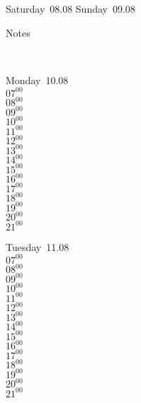 \documentclass[11pt,a4paper]{book}\usepackage[]{graphicx}\usepackage[]{color}
\begin{document}
{{{{{{\begin{tcolorbox}
\end{tcolorbox} 
\begin{tcolorbox}[height=(\textheight-10mm)/6]
Saturday~08.08
\tcblower
Sunday~09.08
\end{tcolorbox} %
\begin{tcolorbox}[height=(\textheight-10mm)/6,sidebyside=false]
Notes
\end{tcolorbox}
\clearpage
\vspace{2 mm}\\
\begin{tcolorbox}
Monday~10.08\\
{ 
  $07^{00}$\\
$08^{00}$\\
$09^{00}$\\
$10^{00}$\\
$11^{00}$\\
$12^{00}$\\
$13^{00}$\\
$14^{00}$\\
$15^{00}$\\
$16^{00}$\\
$17^{00}$\\
$18^{00}$\\
$19^{00}$\\
$20^{00}$\\
$21^{00}$}\\

\end{tcolorbox}
\begin{tcolorbox}
Tuesday~11.08\\
{ 
  $07^{00}$\\
$08^{00}$\\
$09^{00}$\\
$10^{00}$\\
$11^{00}$\\
$12^{00}$\\
$13^{00}$\\
$14^{00}$\\
$15^{00}$\\
$16^{00}$\\
$17^{00}$\\
$18^{00}$\\
$19^{00}$\\
$20^{00}$\\
$21^{00}$}\\


\end{tcolorbox}}}}}}}
\end{document}
